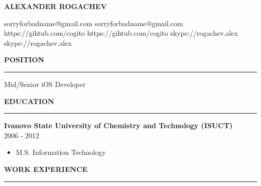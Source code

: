 \documentclass{article}
\newcommand*{\applicant}[1]{\gdef\applicanttext{#1}}
\newcommand*{\github}[1]{\gdef\githubtext{#1}}
\newcommand*{\email}[1]{\gdef\emailtext{#1}}
\newcommand*{\skype}[1]{\gdef\skypetext{#1}}
\renewcommand\maketitle{
  {\setstretch{1.5}
    \centerline{
       \textbf{\huge{\expandafter\MakeUppercase\expandafter{\applicanttext}}}
    }
    \centerline{
      \ifdefined\emailtext
        \faEnvelopeO \hspace{0.1cm} \emailtext \hspace{0.1cm} 
      \fi
      \ifdefined\githubtext
        \faGithub \hspace{0.1cm} \githubtext \hspace{0.1cm} 
      \fi
      \ifdefined\skypetext
        \faSkype \hspace{0.1cm} \skypetext
      \fi
      \ifdefined\linkedintext
        \faLinkedin \hspace{0.1cm} \linkedintext
      \fi
    }
    \vspace{0.2cm}
  }
}
\newcommand{\cvsection}[1]{
  \vspace{2.6ex}
  \noindent\textbf{\large{\uppercase{#1}}}
  \vspace{1ex}
  \hrule
  \vspace{1.5ex}
}
\newcommand{\cvparagraph}[3]{
  \noindent\indent
  \textbf{#1}
  \ 
  \textit{#2}
  \ 
  \hfill{}
  {#3}\vspace{1ex}
}
\begin{document}
\pagestyle{fancy}
\fancyhf{}
\renewcommand{\headrulewidth}{0pt}

\applicant{Alexander Rogachev}
\github{https://gihtub.com/cogito}
\email{sorryforbadname@gmail.com}
\skype{skype://rogachev.alex}

\maketitle

\cvsection{Position}
Mid/Senior iOS Developer

\cvsection{Education}
\cvparagraph{Ivanovo State University of Chemistry and Technology (ISUCT)}{}{2006 - 2012}
\begin{itemize}[topsep=0ex,leftmargin=*]
  \item M.S. Information Technology
\end{itemize}

\cvsection{Work Experience}
\end{document}
